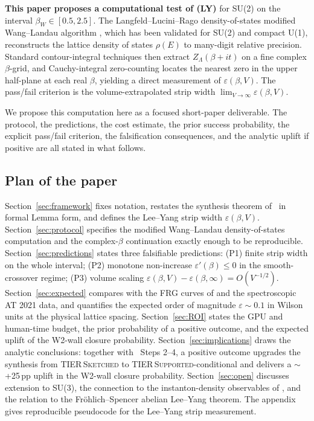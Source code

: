 \documentclass[11pt,a4paper]{article}
\theoremstyle{definition}
\theoremstyle{remark}
\begin{document}
\textbf{This paper proposes a computational test of (LY)} for SU(2)
on the interval $\beta_W \in [0.5, 2.5]$. The Langfeld--Lucini--Rago
density-of-states modified Wang--Landau algorithm
\cite{LangfeldLuciniRago2012}, which has been validated for SU(2)
and compact U(1), reconstructs the lattice density of states
$\rho(E)$ to many-digit relative precision. Standard contour-integral
techniques then extract $Z_\Lambda(\beta+it)$ on a fine complex
$\beta$-grid, and Cauchy-integral zero-counting locates the nearest
zero in the upper half-plane at each real $\beta$, yielding a
direct measurement of $\varepsilon(\beta, V)$. The pass/fail
criterion is the volume-extrapolated strip width
$\lim_{V \to \infty} \varepsilon(\beta, V)$.

We propose this computation here as a focused short-paper
deliverable. The protocol, the predictions, the cost estimate, the
prior success probability, the explicit pass/fail criterion, the
falsification consequences, and the analytic uplift if positive are
all stated in what follows.

\medskip

\subsection{Plan of the paper}

Section~\ref{sec:framework} fixes notation, restates the synthesis
theorem of~\cite{W2analyticite2026} in formal Lemma form, and
defines the Lee--Yang strip width $\varepsilon(\beta, V)$.
Section~\ref{sec:protocol} specifies the modified Wang--Landau
density-of-states computation and the complex-$\beta$ continuation
exactly enough to be reproducible.
Section~\ref{sec:predictions} states three falsifiable predictions:
(P1) finite strip width on the whole interval; (P2) monotone
non-increase $\varepsilon'(\beta) \le 0$ in the smooth-crossover
regime; (P3) volume scaling
$\varepsilon(\beta, V) - \varepsilon(\beta, \infty) = O(V^{-1/2})$.
Section~\ref{sec:expected} compares with the FRG curves of
\cite{Cyrol2016} and the spectroscopic AT 2021 data, and quantifies
the expected order of magnitude
$\varepsilon \sim 0.1$ in Wilson units at the physical lattice
spacing.
Section~\ref{sec:ROI} states the GPU and human-time budget, the
prior probability of a positive outcome, and the expected
uplift of the W2-wall closure probability.
Section~\ref{sec:implications} draws the analytic conclusions:
together with~\cite{W2analyticite2026} Steps 2--4, a positive
outcome upgrades the synthesis from
TIER\,\textsc{Sketched} to TIER\,\textsc{Supported}-conditional and
delivers a $\sim$+25\,pp uplift in the W2-wall closure probability.
Section~\ref{sec:open} discusses extension to SU(3), the
connection to the instanton-density observables of
\cite{BDLV2022}, and the relation to the Fr\"ohlich--Spencer
abelian Lee--Yang theorem.
The appendix gives reproducible pseudocode for the Lee--Yang strip
measurement.
\end{document}
